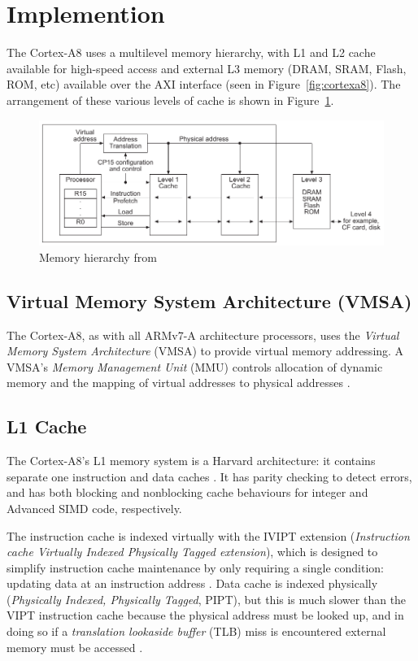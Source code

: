 \documentclass[oneside,a4paper]{report}
\begin{document}
\section{Implemention}

The Cortex-A8 uses a multilevel memory hierarchy, with L1 and L2 cache available for high-speed access and external L3 memory (DRAM, SRAM, Flash, ROM, etc) available over the AXI interface (seen in Figure~\ref{fig:cortexa8}). The arrangement of these various levels of cache is shown in Figure~\ref{fig:memoryhierarchy}.

\begin{figure}[hb]
	\centering
	\includegraphics[width=1.0\textwidth]{./fig/MemoryHierarchy.pdf}
	\caption{Memory hierarchy from \cite[p. A3-52]{ARMRef}}
	\label{fig:memoryhierarchy}
\end{figure}

\subsection{Virtual Memory System Architecture (VMSA)}
The Cortex-A8, as with all ARMv7-A architecture processors, uses the \emph{Virtual Memory System Architecture} (VMSA) to provide virtual memory addressing. A VMSA's \emph{Memory Management Unit} (MMU) controls allocation of dynamic memory and the mapping of virtual addresses to physical addresses \cite[p. B3-2]{ARMRef}.


\subsection{L1 Cache}

The Cortex-A8's L1 memory system is a Harvard architecture: it contains separate one instruction and data caches \cite[p. 7-2]{A8Ref}. It has parity checking to detect errors, and has both blocking and nonblocking cache behaviours for integer and Advanced SIMD code, respectively.

The instruction cache is indexed virtually with the IVIPT extension (\emph{Instruction cache Virtually Indexed Physically Tagged extension}), which is designed to simplify instruction cache maintenance by only requiring a single condition: updating data at an instruction address \cite[p. 7-4]{A8Ref}. Data cache is indexed physically (\emph{Physically Indexed, Physically Tagged}, PIPT), but this is much slower than the VIPT instruction cache because the physical address must be looked up, and in doing so if a \emph{translation lookaside buffer} (TLB) miss is encountered external memory must be accessed \cite[p. 7-8]{A8Ref}.
\end{document}
